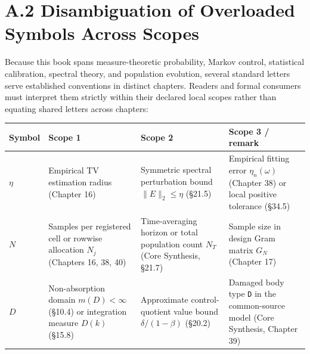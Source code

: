 \documentclass[
  english,
  11pt,
  oneside]{book}
\newcounter{none} %
\begin{document}
\section{A.2 Disambiguation of Overloaded Symbols Across Scopes}\label{a.2-disambiguation-of-overloaded-symbols-across-scopes}

Because this book spans measure-theoretic probability, Markov control, statistical calibration, spectral theory, and population evolution, several standard letters serve established conventions in distinct chapters. Readers and formal consumers must interpret them strictly within their declared local scopes rather than equating shared letters across chapters:

{\def\LTcaptype{none} %
\begin{longtable}[]{@{}
  >{\raggedright\arraybackslash}p{}
  >{\raggedright\arraybackslash}p{}
  >{\raggedright\arraybackslash}p{}
  >{\raggedright\arraybackslash}p{}@{}}
\toprule\noalign{}
\begin{minipage}[b]{\linewidth}\raggedright
Symbol
\end{minipage} & \begin{minipage}[b]{\linewidth}\raggedright
Scope 1
\end{minipage} & \begin{minipage}[b]{\linewidth}\raggedright
Scope 2
\end{minipage} & \begin{minipage}[b]{\linewidth}\raggedright
Scope 3 / remark
\end{minipage} \\
\midrule\noalign{}
\endhead
\bottomrule\noalign{}
\endlastfoot
\(\eta\) & Empirical TV estimation radius (Chapter 16) & Symmetric spectral perturbation bound \(\|E\|_2\le\eta\) (§21.5) & Empirical fitting error \(\eta_n(\omega)\) (Chapter 38) or local positive tolerance (§34.5) \\
\(N\) & Samples per registered cell or rowwise allocation \(N_j\) (Chapters 16, 38, 40) & Time-averaging horizon or total population count \(N_T\) (Core Synthesis, §21.7) & Sample size in design Gram matrix \(G_N\) (Chapter 17) \\
\(D\) & Non-absorption domain \(m(D)<\infty\) (§10.4) or integration measure \(D(k)\) (§15.8) & Approximate control-quotient value bound \(\delta/(1-\beta)\) (§20.2) & Damaged body type \texttt{D} in the common-source model (Core Synthesis, Chapter 39) \\

\end{longtable}}
\end{document}
